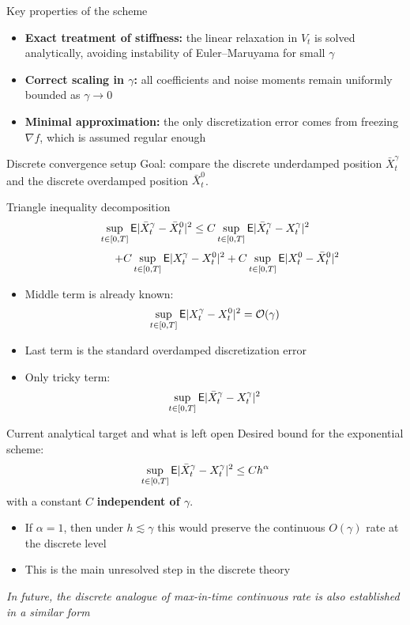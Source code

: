 \documentclass{beamer}
\newcommand{\<}{\langle}
\renewcommand{\>}{\rangle}
\begin{document}
\begin{frame}{Key properties of the scheme}

    \begin{itemize}
        \item \textbf{Exact treatment of stiffness:} the linear relaxation in $V_t$ is solved analytically, avoiding instability of Euler--Maruyama for small $\gamma$
        
        \item \textbf{Correct scaling in $\gamma$:} all coefficients and noise moments remain uniformly bounded as $\gamma\to 0$
        
        \item \textbf{Minimal approximation:} the only discretization error comes from freezing $\nabla f$, which is assumed regular enough
    \end{itemize}

\end{frame}

\begin{frame}{Discrete convergence setup}
    Goal: compare the discrete underdamped position $\bar X_t^\gamma$ and the discrete overdamped position $\bar X_t^0$.
    \bigskip
    \begin{block}{Triangle inequality decomposition}
        \[
        \sup_{t\in[0,T]}{\mathsf E}|\bar X_t^\gamma-\bar X_t^0|^2
        \le
        C\sup_{t\in[0,T]}{\mathsf E}|\bar X_t^\gamma-X_t^\gamma|^2
        \]
        \[
        \qquad\qquad
        +C\sup_{t\in[0,T]}{\mathsf E}|X_t^\gamma-X_t^0|^2
        +C\sup_{t\in[0,T]}{\mathsf E}|X_t^0-\bar X_t^0|^2
        \]
    \end{block}
    \begin{itemize}
        \item Middle term is already known:
        \[
        \sup_{t\in[0,T]}{\mathsf E}|X_t^\gamma-X_t^0|^2=\mathcal{O}(\gamma)
        \]
        \item Last term is the standard overdamped discretization error
        \item Only tricky term:
        \[
        \sup_{t\in[0,T]}{\mathsf E}|\bar X_t^\gamma-X_t^\gamma|^2
        \]
    \end{itemize}
\end{frame}

\begin{frame}{Current analytical target and what is left open}
    Desired bound for the exponential scheme:
    \[
    \sup_{t\in[0,T]}{\mathsf E}|\bar X_t^\gamma-X_t^\gamma|^2\le Ch^\alpha
    \]
    with a constant $C$ \textbf{independent of $\gamma$}.
    \bigskip
    \begin{itemize}
        \item If $\alpha=1$, then under $h\lesssim\gamma$ this would preserve the continuous $O(\gamma)$ rate at the discrete level
        \item This is the main unresolved step in the discrete theory
    \end{itemize}

    \bigskip
    
    \textit{In future, the discrete analogue of max-in-time continuous rate is also established in a similar form}
\end{frame}
\end{document}
